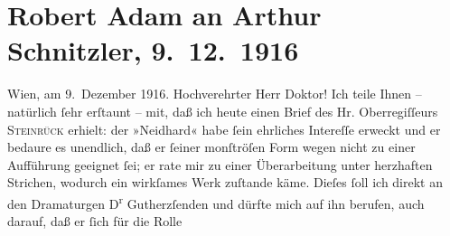 

         
         \newcommand{\erwaehntePersonen}{Personen: Gerhard Gutherz, Albert Steinrück}
         \newcommand{\erwaehnteOrte}{Orte: Wien}
         \newcommand{\erwaehnteWerke}{Werke: Der Fremde, Die Geschichte des Alî ibn Bekkâr mit Schams an-Nahâr, Neidhard}
               \section[Robert Adam an Arthur Schnitzler, 9. 12. 1916]{ Robert Adam an Arthur Schnitzler, 9. 12. 1916}\nopagebreak{}\rehead{ }\begin{ledgroupsized}[t]{13cm}\normalsize\beginnumbering \toendnotes[C]{\smallbreak\pagebreak[2]} 
\toendnotes[C]{\smallbreak}\pstart
           \raggedleft{}{\pb}Wien, am 9. Dezember
                        1916.\pend
           \pstart{}Hochverehrter Herr Doktor!\pend\pstart
           Ich teile Ihnen – natürlich ſehr erſtaunt – mit, daß ich heute einen Brief des
                    Hr. Oberregiſſeurs \textsc{Steinrück} erhielt: der »Neidhard« habe ſein
                    ehrliches Intereſſe erweckt und er bedaure es unendlich, daß er ſeiner
                    monſtröſen Form wegen nicht zu einer Aufführung geeignet ſei; er rate mir zu
                    einer Überarbeitung unter herzhaften Strichen, wodurch ein wirkſames Werk
                    zuſtande käme. Dieſes ſoll ich direkt an den Dramaturgen D\textsuperscript{r}{ }Gutherzſenden und dürfte mich auf ihn be{\pb}rufen, auch darauf, daß er ſich für die Rolle

\end{ledgroupsized}
